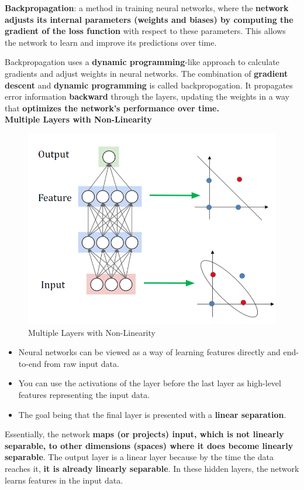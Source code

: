 \begin{definition}
    \textbf{Backpropagation}: a method in training neural networks, where the \textbf{network adjusts its internal parameters (weights and biases) by computing the gradient of the loss function} with respect to these parameters. This allows the network to learn and improve its predictions over time.
\end{definition}

Backpropagation uses a \textbf{dynamic programming}-like approach to calculate gradients and adjust weights in neural networks. The combination of \textbf{gradient descent} and \textbf{dynamic programming} is called backpropogation. It propagates error information \textbf{backward} through the layers, updating the weights in a way that \textbf{optimizes the network's performance over time.}  \\

\noindent\textbf{Multiple Layers with Non-Linearity}

\begin{figure}[h!t]
    \centering
    \includegraphics[width=0.4\linewidth]{multiplelayersnonlinearity.png}
    \caption{Multiple Layers with Non-Linearity}
    \label{fig:enter-label}
\end{figure}
\begin{itemize}
    \item Neural networks can be viewed as a way of learning features directly and end-to-end from raw input data.
    \item You can use the activations of the layer before the last layer as high-level features representing the input data.
    \item The goal being that the final layer is presented with a \textbf{linear separation}.
\end{itemize}

\begin{idea}
 Essentially, the network \textbf{maps (or projects) input, which is not linearly separable, to other dimensions (spaces) where it does become linearly separable}. The output layer is a linear layer because by the time the data reaches it, \textbf{it is already linearly separable}. In these hidden layers, the network learns features in the input data.
\end{idea}

